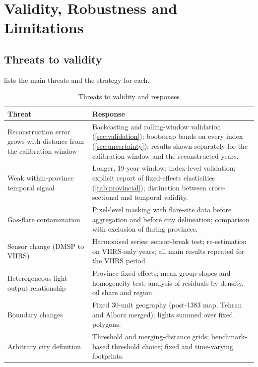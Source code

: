 \documentclass[11pt,a4paper]{article}
\begin{document}
\section{Validity, Robustness and Limitations}\label{sec:validity}

\subsection{Threats to validity}

 lists the main threats and the strategy for each.

\begin{table}[htbp]
\centering\small
\caption{Threats to validity and responses}
\label{tab:threats}
\begin{tabularx}{\textwidth}{@{}>{\raggedright\arraybackslash}p{3.6cm}>{\raggedright\arraybackslash}X@{}}
\toprule
\textbf{Threat} & \textbf{Response}\\
\midrule
Reconstruction error grows with distance from the calibration window & Backcasting and rolling-window validation (\cref{sec:validation}); bootstrap bands on every index (\cref{sec:uncertainty}); results shown separately for the calibration window and the reconstructed years.\\
\addlinespace
Weak within-province temporal signal & Longer, 19-year window; index-level validation; explicit report of fixed-effects elasticities (\cref{tab:provincial}); \citet{Galimberti2023} distinction between cross-sectional and temporal validity.\\
\addlinespace
Gas-flare contamination & Pixel-level masking with flare-site data before aggregation and before city delineation; comparison with exclusion of flaring provinces.\\
\addlinespace
Sensor change (DMSP to VIIRS) & Harmonised series; sensor-break test; re-estimation on VIIRS-only years; all main results repeated for the VIIRS period.\\
\addlinespace
Heterogeneous light--output relationship & Province fixed effects; mean-group slopes and homogeneity test; analysis of residuals by density, oil share and region.\\
\addlinespace
Boundary changes & Fixed 30-unit geography (post-1383 map, Tehran and Alborz merged); lights summed over fixed polygons.\\
\addlinespace
Arbitrary city definition & Threshold and merging-distance grids; benchmark-based threshold choice; fixed and time-varying footprints.\\

\end{tabularx}
\end{table}
\end{document}
